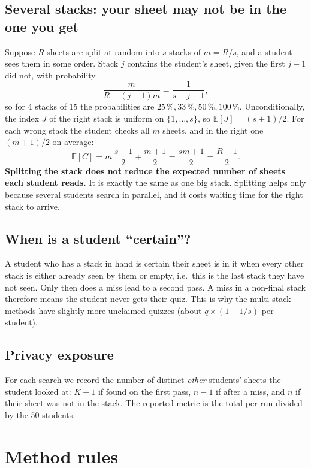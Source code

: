 \documentclass[11pt,a4paper]{article}
\newcommand{\E}{\mathbb{E}}
\begin{document}
\subsection{Several stacks: your sheet may not be in the one you get}\label{sec:multi}
Suppose $R$ sheets are split at random into $s$ stacks of $m = R/s$, and a student sees them in some order.
Stack $j$ contains the student's sheet, given the first $j-1$ did not, with probability
\[
\frac{m}{R-(j-1)m} = \frac{1}{s-j+1},
\]
so for 4 stacks of 15 the probabilities are $25\,\%, 33\,\%, 50\,\%, 100\,\%$. Unconditionally, the index $J$ of the right stack is uniform on $\{1,\dots,s\}$, so $\E[J] = (s+1)/2$.
For each wrong stack the student checks all $m$ sheets, and in the right one $(m+1)/2$ on average:
\[
\E[C] = m\,\frac{s-1}{2} + \frac{m+1}{2} = \frac{sm+1}{2} = \frac{R+1}{2}.
\]
\textbf{Splitting the stack does not reduce the expected number of sheets each student reads.} It is exactly the same as one big stack. Splitting helps only because several students search in parallel, and it costs waiting time for the right stack to arrive.

\subsection{When is a student ``certain''?}\label{sec:certain}
A student who has a stack in hand is certain their sheet is in it when every other stack is either already seen by them or empty, i.e.\ this is the last stack they have not seen.
Only then does a miss lead to a second pass. A miss in a non-final stack therefore means the student never gets their quiz. This is why the multi-stack methods have slightly more unclaimed quizzes (about $q\times(1-1/s)$ per student).

\subsection{Privacy exposure}
For each search we record the number of distinct \emph{other} students' sheets the student looked at:
$K-1$ if found on the first pass, $n-1$ if after a miss, and $n$ if their sheet was not in the stack.
The reported metric is the total per run divided by the 50 students.

\section{Method rules}\label{sec:methods}
\end{document}
